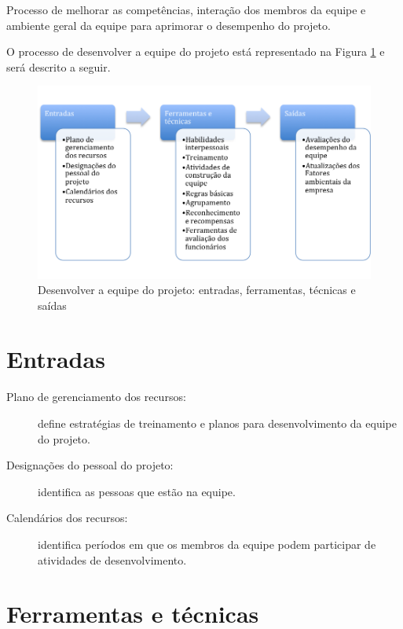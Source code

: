 Processo de melhorar as competências, interação dos membros da equipe e ambiente geral da equipe para aprimorar o desempenho do projeto.

O processo de desenvolver a equipe do projeto está representado na Figura \ref{fig:rh:desenv:efts} e será descrito a seguir.

\begin{figure}[!h]
	\centering
	\includegraphics[scale=0.5]{Figuras/rh_efts_desenvolver.png}
	\caption{Desenvolver a equipe do projeto: entradas, ferramentas, técnicas e saídas}
	\label{fig:rh:desenv:efts}
\end{figure}

\section{Entradas}

\begin{description}

	\item[Plano de gerenciamento dos recursos:] define estratégias de treinamento e planos para desenvolvimento da equipe do projeto.
	
	\item[Designações do pessoal do projeto:] identifica as pessoas que estão na equipe.
	
	\item[Calendários dos recursos:] identifica períodos em que os membros da equipe podem participar de atividades de desenvolvimento.
	
	
\end{description}

\section{Ferramentas e técnicas}

